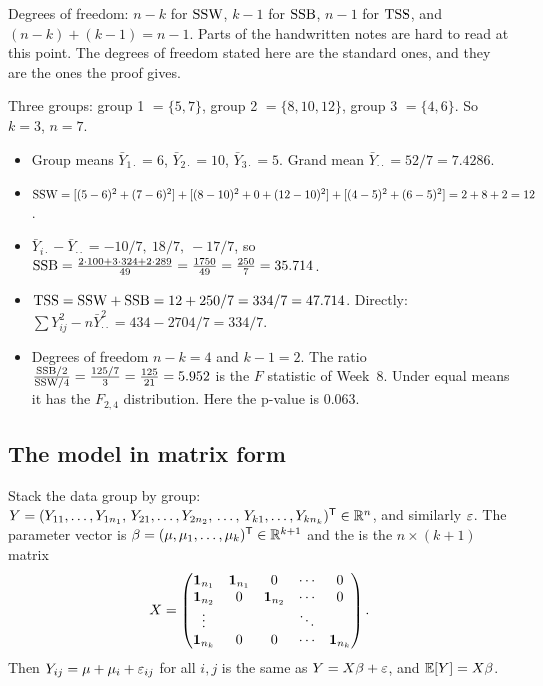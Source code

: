 \begin{note}
Degrees of freedom: $n-k$ for $\mathrm{SSW}$, $k-1$ for $\mathrm{SSB}$, $n-1$ for $\mathrm{TSS}$, and $(n-k)+(k-1)=n-1$.
Parts of the handwritten notes are hard to read at this point. The degrees of freedom stated
here are the standard ones, and they are the ones the proof gives.
\end{note}

\begin{example}\label{ex:L08-SS}
Three groups: group 1 $=\{5,7\}$, group 2 $=\{8,10,12\}$, group 3 $=\{4,6\}$. So $k=3$, $n=7$.
\begin{itemize}
  \item Group means $\bar Y_{1\cdot}=6$, $\bar Y_{2\cdot}=10$, $\bar Y_{3\cdot}=5$. Grand mean $\bar Y_{\cdot\cdot}=52/7=7.4286$.
  \item $\mathrm{SSW}=[(5-6)^2+(7-6)^2]+[(8-10)^2+0+(12-10)^2]+[(4-5)^2+(6-5)^2]=2+8+2=12$.
  \item $\bar Y_{i\cdot}-\bar Y_{\cdot\cdot}=-10/7,\ 18/7,\ -17/7$, so
  $\mathrm{SSB}=\frac{2\cdot100+3\cdot324+2\cdot289}{49}=\frac{1750}{49}=\frac{250}{7}=35.714$.
  \item $\mathrm{TSS}=\mathrm{SSW}+\mathrm{SSB}=12+250/7=334/7=47.714$. Directly: $\sum Y_{ij}^2-n\bar Y_{\cdot\cdot}^2=434-2704/7=334/7$. \checkmark
  \item Degrees of freedom $n-k=4$ and $k-1=2$. The ratio $\frac{\mathrm{SSB}/2}{\mathrm{SSW}/4}=\frac{125/7}{3}=\frac{125}{21}=5.952$ is the $F$ statistic of Week~8. Under equal means it has the $F_{2,4}$ distribution. Here the p-value is $0.063$.
\end{itemize}
\end{example}

\subsection{The model in matrix form}
Stack the data group by group:
$Y=(Y_{11},\dots,Y_{1n_1},\,Y_{21},\dots,Y_{2n_2},\,\dots,\,Y_{k1},\dots,Y_{kn_k})^{\mathsf T}\in\mathbb R^n$,
and similarly $\varepsilon$. The parameter vector is $\beta=(\mu,\mu_1,\dots,\mu_k)^{\mathsf T}\in\mathbb R^{k+1}$ and
the  is the $n\times(k+1)$ matrix
\[
X=\begin{pmatrix}
\mathbf 1_{n_1} & \mathbf 1_{n_1} & 0 & \cdots & 0\\
\mathbf 1_{n_2} & 0 & \mathbf 1_{n_2} & \cdots & 0\\
\vdots & & & \ddots & \\
\mathbf 1_{n_k} & 0 & 0 & \cdots & \mathbf 1_{n_k}
\end{pmatrix}.
\]
Then $Y_{ij}=\mu+\mu_i+\varepsilon_{ij}$ for all $i,j$ is the same as $Y=X\beta+\varepsilon$, and $\mathbb E[Y]=X\beta$.


